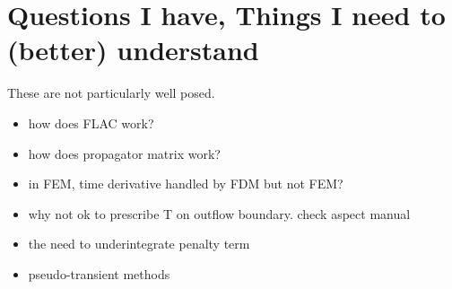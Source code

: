 \documentclass[a4paper]{article}
\begin{document}
\newpage
\section{Questions I have, Things I need to (better) understand}

These are not particularly well posed. 

\begin{itemize}
\item how does FLAC work?
\item how does propagator matrix work?
\item in FEM, time derivative handled by FDM but not FEM?
\item why not ok to prescribe T on outflow boundary. check aspect manual
\item the need to underintegrate penalty term
\item pseudo-transient methods
\end{itemize}
\end{document}
